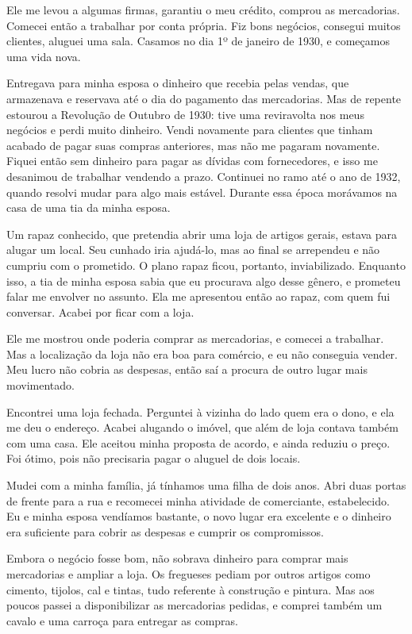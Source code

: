Ele me levou a algumas firmas, garantiu o meu crédito, comprou as
mercadorias. Comecei então a trabalhar por conta própria. Fiz bons
negócios, consegui muitos clientes, aluguei uma sala. Casamos no dia 1º
de janeiro de 1930, e começamos uma vida nova.

Entregava para minha esposa o dinheiro que recebia pelas vendas, que
armazenava e reservava até o dia do pagamento das mercadorias. Mas de repente estourou a
Revolução de Outubro de 1930: tive uma reviravolta nos meus negócios
e perdi muito dinheiro. Vendi novamente para clientes que tinham acabado de
pagar suas compras anteriores, mas não me pagaram novamente. Fiquei então sem
dinheiro para pagar as dívidas com fornecedores, e isso me desanimou de trabalhar vendendo a prazo.
Continuei no ramo até o ano de 1932, quando resolvi mudar para algo mais estável. Durante essa época morávamos na casa de uma tia da minha esposa. 

Um rapaz conhecido, que pretendia abrir uma loja de artigos gerais, estava para alugar um
local. Seu cunhado iria ajudá-lo, mas ao final se arrependeu e não cumpriu com
o prometido. O plano rapaz ficou, portanto, inviabilizado. Enquanto isso, a tia de 
minha esposa sabia que eu procurava algo desse gênero, e prometeu falar me envolver no assunto. 
Ela me apresentou então ao rapaz, com quem fui conversar. Acabei por ficar com a loja. 

Ele me mostrou onde poderia comprar as mercadorias, e comecei a trabalhar. 
Mas a localização da loja não era
boa para comércio, e eu não conseguia vender. Meu lucro não cobria as despesas, 
então saí a procura de outro lugar mais movimentado.

Encontrei uma loja fechada. Perguntei à vizinha do lado quem era o dono, e ela me deu o 
endereço. Acabei alugando o imóvel, que além de loja contava também com uma casa. Ele aceitou minha 
proposta de acordo, e ainda reduziu o preço. Foi ótimo, pois não precisaria pagar o aluguel de dois locais. 

Mudei com a minha família, já tínhamos uma filha de dois anos. Abri
duas portas de frente para a rua e recomecei minha atividade de
comerciante, estabelecido. Eu e minha esposa vendíamos bastante,
o novo lugar era excelente e o dinheiro era suficiente
para cobrir as despesas e cumprir os compromissos.

Embora o negócio fosse bom, não sobrava dinheiro para comprar mais
mercadorias e ampliar a loja. Os fregueses pediam por outros artigos como 
cimento, tijolos, cal e tintas, tudo referente à construção e
pintura. Mas aos poucos passei a disponibilizar as mercadorias pedidas, e
comprei também um cavalo e uma carroça para entregar as compras.

